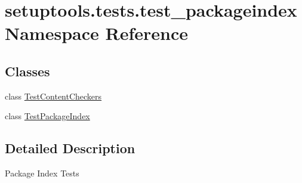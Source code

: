 \hypertarget{namespacesetuptools_1_1tests_1_1test__packageindex}{}\section{setuptools.\+tests.\+test\+\_\+packageindex Namespace Reference}
\label{namespacesetuptools_1_1tests_1_1test__packageindex}
\subsection*{Classes}
\begin{DoxyCompactItemize}
\item 
class \hyperlink{classsetuptools_1_1tests_1_1test__packageindex_1_1TestContentCheckers}{Test\+Content\+Checkers}
\item 
class \hyperlink{classsetuptools_1_1tests_1_1test__packageindex_1_1TestPackageIndex}{Test\+Package\+Index}
\end{DoxyCompactItemize}


\subsection{Detailed Description}
\begin{DoxyVerb}Package Index Tests
\end{DoxyVerb}
 